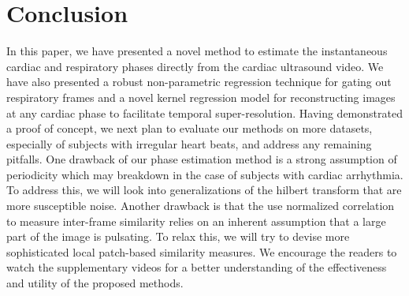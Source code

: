 \documentclass[runningheads,a4paper]{llncs}
\begin{document}
\section{Conclusion}
\label{sec:conclusion}
%
In this paper, we have presented a novel method to estimate the instantaneous cardiac and respiratory phases directly from the cardiac ultrasound video. We have also presented a robust non-parametric regression technique for gating out respiratory frames and a novel kernel regression model for reconstructing images at any cardiac phase to facilitate temporal super-resolution. Having demonstrated a proof of concept, we next plan to evaluate our methods on more datasets, especially of subjects with irregular heart beats, and address any remaining pitfalls. One drawback of our phase estimation method is a strong assumption of periodicity which may breakdown in the case of subjects with cardiac arrhythmia. To address this, we will look into generalizations of the hilbert transform\cite{Lu2013} that are more susceptible noise. Another drawback is that the use normalized correlation to measure inter-frame similarity relies on an inherent assumption that a large part of the image is pulsating. To relax this, we will try to devise more sophisticated local patch-based similarity measures. We encourage the readers to watch the supplementary videos for a better understanding of the effectiveness and utility of the proposed methods. 
%
\vspace{-0.5cm}


\end{document}
